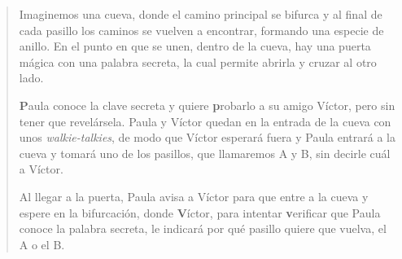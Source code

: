 \begin{quote}
Imaginemos una cueva, donde el camino principal se bifurca y al final de cada pasillo los caminos se vuelven a encontrar, formando una especie de anillo. En el punto en que se unen, dentro de la cueva, hay una puerta mágica con una palabra secreta, la cual permite abrirla y cruzar al otro lado.

\textbf{P}aula conoce la clave secreta y quiere \textbf{p}robarlo a su amigo Víctor, pero sin tener que revelársela.
Paula y Víctor quedan en la entrada de la cueva con unos \textit{walkie-talkies}, de modo que Víctor esperará fuera y Paula entrará a la cueva y tomará uno de los pasillos, que llamaremos A y B, sin decirle cuál a Víctor.


Al llegar a la puerta, Paula avisa a Víctor para que entre a la cueva y espere en la bifurcación, donde \textbf{V}íctor, para intentar \textbf{v}erificar que Paula conoce la palabra secreta, le indicará por qué pasillo quiere que vuelva, el A o el B.




\end{quote}
